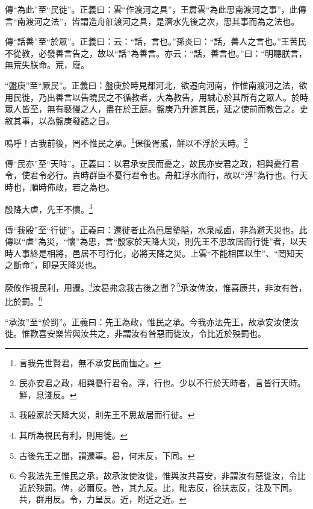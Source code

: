 {\noindent\zhuan{}\fzbyks 傳“為此”至“民徙”。正義曰：雲“作渡河之具”，王肅雲“為此思南渡河之事”，此傳言“南渡河之法”，皆謂造舟舡渡河之具，是濟水先後之次，思其事而為之法也。 \par}

{\noindent\zhuan{}\fzbyks 傳“話善”至“於眾”。正義曰：云：“話，言也。”孫炎曰：“話，善人之言也。”王苦民不從教，必發善言告之，故以“話”為善言。亦云：“話，善言也。”曰：“明聽朕言，無荒失朕命。荒，廢。 \par}

{\noindent\shu{}\fzkt “盤庚”至“厥民”。正義曰：盤庚於時見都河北，欲遷向河南，作惟南渡河之法，欲用民徙，乃出善言以告曉民之不循教者，大為教告，用誠心於其所有之眾人。於時眾人皆至，無有褻慢之人，盡在於王庭。盤庚乃升進其民，延之使前而教告之。史敘其事，以為盤庚發誥之目。 \par}

嗚呼！古我前後，罔不惟民之承。\footnote{言我先世賢君，無不承安民而恤之。}保後胥戚，鮮以不浮於天時。\footnote{民亦安君之政，相與憂行君令。浮，行也。少以不行於天時者，言皆行天時。鮮，息淺反。}

{\noindent\zhuan{}\fzbyks 傳“民亦”至“天時”。正義曰：以君承安民而憂之，故民亦安君之政，相與憂行君令，使君令必行。責時群臣不憂行君令也。舟舡浮水而行，故以“浮”為行也。行天時也，順時佈政，若之為也。 \par}

殷降大虐，先王不懷。\footnote{我殷家於天降大災，則先王不思故居而行徙。}

{\noindent\zhuan{}\fzbyks 傳“我殷”至“行徙”。正義曰：遷徙者止為邑居墊隘，水泉咸鹵，非為避天災也。此傳以“虐”為災，“懷”為思，言“殷家於天降大災，則先王不思故居而行徙”者，以天時人事終是相將，邑居不可行化，必將天降之災。上雲“不能相匡以生”、“罔知天之斷命”，即是天降災也。 \par}

厥攸作視民利，用遷。\footnote{其所為視民有利，則用徙。}汝曷弗念我古後之聞？\footnote{古後先王之聞，謂遷事。曷，何末反，下同。}承汝俾汝，惟喜康共，非汝有咎，比於罰。\footnote{今我法先王惟民之承，故承汝使汝徙，惟與汝共喜安，非謂汝有惡徙汝，令比近於殃罰。俾，必爾反。咎，其九反。比，毗志反，徐扶志反，注及下同。共，群用反。令，力呈反。近，附近之近。}

{\noindent\shu{}\fzkt “承汝”至“於罰”。正義曰：先王為政，惟民之承。今我亦法先王，故承安汝使汝徙。惟歡喜安樂皆與汝共之，非謂汝有咎惡而徙汝，令比近於殃罰也。 \par}

